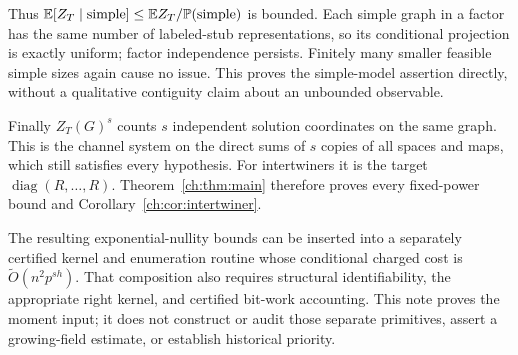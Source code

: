 Thus $\mathbb E[Z_T\mid\mathrm{simple}]\le\mathbb E Z_T/\mathbb P(\mathrm{simple})$ is bounded. Each simple graph in a factor has the same number of labeled-stub representations, so its conditional projection is exactly uniform; factor independence persists. Finitely many smaller feasible simple sizes again cause no issue. This proves the simple-model assertion directly, without a qualitative contiguity claim about an unbounded observable.

Finally $Z_T(G)^s$ counts $s$ independent solution coordinates on the same graph. This is the channel system on the direct sums of $s$ copies of all spaces and maps, which still satisfies every hypothesis. For intertwiners it is the target $\operatorname{diag}(R,\ldots,R)$. Theorem~\ref{ch:thm:main} therefore proves every fixed-power bound and Corollary~\ref{ch:cor:intertwiner}.

The resulting exponential-nullity bounds can be inserted into a separately certified kernel and enumeration routine whose conditional charged cost is $\widetilde O(n^2p^{s h})$. That composition also requires structural identifiability, the appropriate right kernel, and certified bit-work accounting. This note proves the moment input; it does not construct or audit those separate primitives, assert a growing-field estimate, or establish historical priority.
